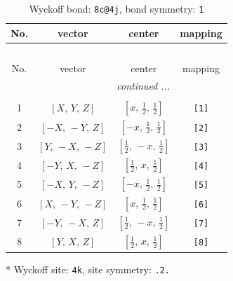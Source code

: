 \documentclass[fleqn,8pt]{jsarticle}
\begin{document}
\renewcommand{\arraystretch}{1.2}
\begin{longtable}{cccc}
\caption{Wyckoff bond: {\tt 8c@4j}, bond symmetry: {\tt 1}}
 \\
 \hline \hline
No. & vector & center & mapping \\ \hline \endfirsthead

\multicolumn{3}{l}{\tablename\ \thetable{}} \\
 \hline \hline
No. & vector & center & mapping \\ \hline \endhead

 \hline \hline
\multicolumn{3}{r}{\footnotesize\it continued ...} \\ \endfoot

 \hline \hline
\multicolumn{3}{r}{} \\ \endlastfoot

1 & $\left[ X,\, Y,\, Z \right]$ & $\left[ x,\, \frac{1}{2},\, \frac{1}{2} \right]$ & {\tt [1]} \\ \hline
2 & $\left[ - X,\, - Y,\, Z \right]$ & $\left[ - x,\, \frac{1}{2},\, \frac{1}{2} \right]$ & {\tt [2]} \\ \hline
3 & $\left[ Y,\, - X,\, - Z \right]$ & $\left[ \frac{1}{2},\, - x,\, \frac{1}{2} \right]$ & {\tt [3]} \\ \hline
4 & $\left[ - Y,\, X,\, - Z \right]$ & $\left[ \frac{1}{2},\, x,\, \frac{1}{2} \right]$ & {\tt [4]} \\ \hline
5 & $\left[ - X,\, Y,\, - Z \right]$ & $\left[ - x,\, \frac{1}{2},\, \frac{1}{2} \right]$ & {\tt [5]} \\ \hline
6 & $\left[ X,\, - Y,\, - Z \right]$ & $\left[ x,\, \frac{1}{2},\, \frac{1}{2} \right]$ & {\tt [6]} \\ \hline
7 & $\left[ - Y,\, - X,\, Z \right]$ & $\left[ \frac{1}{2},\, - x,\, \frac{1}{2} \right]$ & {\tt [7]} \\ \hline
8 & $\left[ Y,\, X,\, Z \right]$ & $\left[ \frac{1}{2},\, x,\, \frac{1}{2} \right]$ & {\tt [8]} \\
\end{longtable}
* Wyckoff site: {\tt 4k}, site symmetry: {\tt .2.}
\renewcommand{\arraystretch}{1.2}
\end{document}
